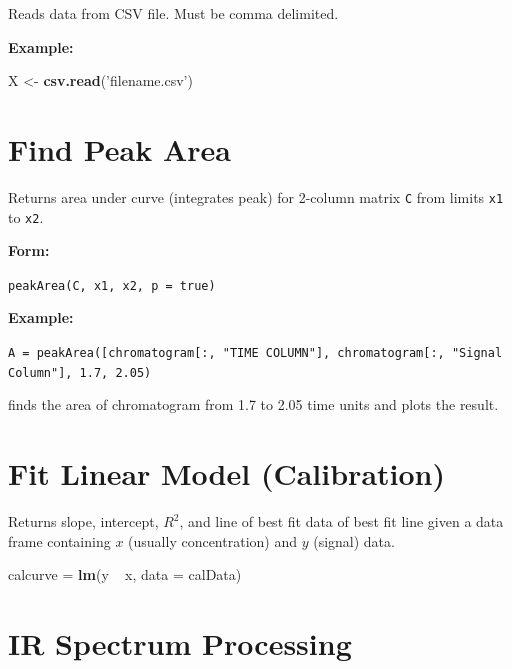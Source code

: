\documentclass[]{tufte-book}
\newenvironment{Shaded}{}{}
\newcommand{\DataTypeTok}[1]{\textcolor[rgb]{0.56,0.13,0.00}{#1}}
\newcommand{\KeywordTok}[1]{\textcolor[rgb]{0.00,0.44,0.13}{\textbf{#1}}}
\newcommand{\NormalTok}[1]{#1}
\newcommand{\OperatorTok}[1]{\textcolor[rgb]{0.40,0.40,0.40}{#1}}
\newcommand{\StringTok}[1]{\textcolor[rgb]{0.25,0.44,0.63}{#1}}
\begin{document}
Reads data from CSV file. Must be comma delimited.

\textbf{Example:}

\begin{Shaded}
\begin{Highlighting}[]
\NormalTok{X <-}\StringTok{ }\KeywordTok{csv.read}\NormalTok{(}\StringTok{'filename.csv'}\NormalTok{)}
\end{Highlighting}
\end{Shaded}

\hypertarget{find-peak-area}{%
\section*{Find Peak Area}\label{find-peak-area}}

Returns area under curve (integrates peak) for 2-column matrix \texttt{C} from limits \texttt{x1} to \texttt{x2}.

\textbf{Form:}

\texttt{peakArea(C,\ x1,\ x2,\ p\ =\ true)}

\textbf{Example:}

\texttt{A\ =\ peakArea({[}chromatogram{[}:,\ "TIME\ COLUMN"{]},\ chromatogram{[}:,\ "Signal\ Column"{]},\ 1.7,\ 2.05)}

finds the area of chromatogram from 1.7 to 2.05 time units and plots the result.

\hypertarget{fit-linear-model-calibration}{%
\section*{Fit Linear Model (Calibration)}\label{fit-linear-model-calibration}}

Returns slope, intercept, \(R^2\), and line of best fit data of best fit line given a data frame containing \(x\) (usually concentration) and \(y\) (signal) data.

\begin{Shaded}
\begin{Highlighting}[]
\NormalTok{calcurve =}\StringTok{ }\KeywordTok{lm}\NormalTok{(y }\OperatorTok{~}\StringTok{ }\NormalTok{x, }\DataTypeTok{data =}\NormalTok{ calData)}
\end{Highlighting}
\end{Shaded}

\hypertarget{ir-spectrum-processing}{%
\section*{IR Spectrum Processing}\label{ir-spectrum-processing}}
\end{document}
